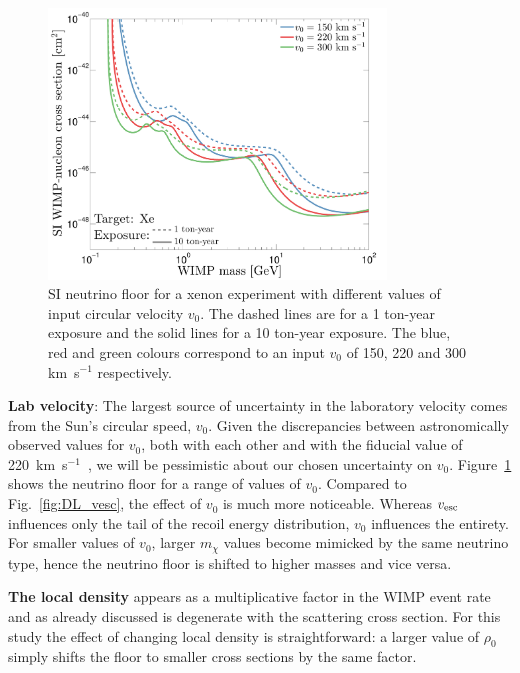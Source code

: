 \begin{figure}
\begin{center}
\includegraphics[trim = 0mm 0 0mm 0mm, clip, width=0.8\textwidth,angle=0]{Figures/DL_v0-eps-converted-to.pdf}
\caption[Neutrino floor with different values of input circular velocity $v_0$]{SI neutrino floor for a xenon experiment with different values of input circular velocity $v_0$. The dashed lines are for a 1 ton-year exposure and the solid lines for a 10 ton-year exposure. The blue, red and green colours correspond to an input $v_0$ of 150, 220 and 300 km~s$^{-1}$ respectively.}
\label{fig:DL_v0}
\end{center}
\end{figure} 
{\bf Lab velocity}: The largest source of uncertainty in the laboratory velocity comes from the Sun's circular speed, $v_0$. Given the discrepancies between astronomically observed values for $v_0$, both with each other and with the fiducial value of 220~km~s$^{-1}$~\cite{McMillan:2009yr}, we will be pessimistic about our chosen uncertainty on $v_0$. Figure~\ref{fig:DL_v0} shows the neutrino floor for a range of values of $v_0$. Compared to Fig.~\ref{fig:DL_vesc}, the effect of $v_0$ is much more noticeable. Whereas $v_{\rm esc}$ influences only the tail of the recoil energy distribution, $v_0$ influences the entirety. For smaller values of $v_0$, larger $m_\chi$ values become mimicked by the same neutrino type, hence the neutrino floor is shifted to higher masses and vice versa.
 
{\bf The local density} appears as a multiplicative factor in the WIMP event rate and as already discussed is degenerate with the scattering cross section. For this study the effect of changing local density is straightforward: a larger value of $\rho_0$ simply shifts the floor to smaller cross sections by the same factor.

